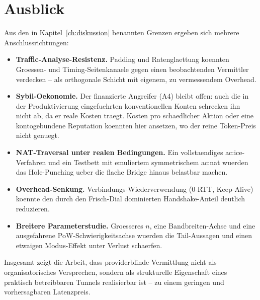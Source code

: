 \section{Ausblick}
\label{sec:fazit-ausblick}

Aus den in Kapitel~\ref{ch:diskussion} benannten Grenzen ergeben sich mehrere
Anschlussrichtungen:

\begin{itemize}
  \item \textbf{Traffic-Analyse-Resistenz.} Padding und Ratenglaettung koennten
    Groessen- und Timing-Seitenkanaele gegen einen beobachtenden Vermittler
    verdecken -- als orthogonale Schicht mit eigenem, zu vermessendem Overhead.
  \item \textbf{Sybil-Oekonomie.} Der finanzierte Angreifer (A4) bleibt offen:
    auch die in der Produktivierung eingefuehrten konventionellen Konten
    schrecken ihn nicht ab, da er reale Kosten traegt. Kosten pro schaedlicher
    Aktion oder eine kontogebundene Reputation koennten hier ansetzen, wo der
    reine Token-Preis nicht genuegt.
  \item \textbf{NAT-Traversal unter realen Bedingungen.} Ein vollstaendiges
    \gls{ac:ice}-Verfahren und ein Testbett mit emuliertem symmetrischem
    \gls{ac:nat} wuerden das Hole-Punching ueber die flache Bridge hinaus
    belastbar machen.
  \item \textbf{Overhead-Senkung.} Verbindungs-Wiederverwendung (0-RTT,
    Keep-Alive) koennte den durch den Frisch-Dial dominierten Handshake-Anteil
    deutlich reduzieren.
  \item \textbf{Breitere Parameterstudie.} Groesseres $n$, eine
    Bandbreiten-Achse und eine ausgefahrene PoW-Schwierigkeitsachse wuerden die
    Tail-Aussagen und einen etwaigen Modus-Effekt unter Verlust schaerfen.
\end{itemize}

Insgesamt zeigt die Arbeit, dass providerblinde Vermittlung nicht als
organisatorisches Versprechen, sondern als strukturelle Eigenschaft eines
praktisch betreibbaren Tunnels realisierbar ist -- zu einem geringen und
vorhersagbaren Latenzpreis.
